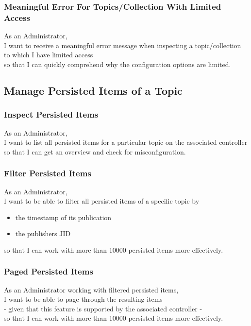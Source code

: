 \subsubsection{Meaningful Error For Topics/Collection With Limited Access}

As an Administrator,\\
I want to receive a meaningful error message when inspecting a topic/collection to which I have limited access \\
so that I can quickly comprehend why the configuration options are limited.

\subsection{Manage Persisted Items of a Topic}\label{sec:manage-persisted-items}
\subsubsection{Inspect Persisted Items}

As an Administrator,\\
I want to list all persisted items for a particular topic on the associated controller \\
so that I can get an overview and check for misconfiguration.

\subsubsection{Filter Persisted Items}\label{sec:requirement-filter-persisted-items}

As an Administrator,\\
I want to be able to filter all persisted items of a specific topic by \\
\begin{itemize}
    \item the timestamp of its publication
    \item the publishers JID
\end{itemize}
so that I can work with more than 10000 persisted items more effectively.

\subsubsection{Paged Persisted Items}\label{sec:paged-persisted-items}
As an Administrator working with filtered persisted items,\\
I want to be able to page through the resulting items\\
- given that this feature is supported by the associated controller -\\
so that I can work with more than 10000 persisted items more effectively.

